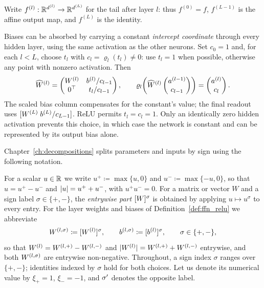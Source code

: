 Write $f^{(l)}:\mathbb{R}^{d^{(l)}}\to\mathbb{R}^{d^{(L)}}$ for the tail after layer $l$: thus $f^{(0)}=f$, $f^{(L-1)}$ is the affine output map, and $f^{(L)}$ is the identity.

\begin{remark}\label{rem:bias_augmentation}
Biases can be absorbed by carrying a constant \emph{intercept coordinate} through every hidden layer, using the same activation as the other neurons. Set $c_0=1$ and, for each $l<L$, choose $t_l$ with $c_l=\varrho_l(t_l)\neq0$: use $t_l=1$ when possible, otherwise any point with nonzero activation. Then
\[
\widehat W^{(l)}=
\begin{pmatrix}W^{(l)}&b^{(l)}/c_{l-1}\\0^\top&t_l/c_{l-1}\end{pmatrix},
\qquad
\varrho_l\!\left(\widehat W^{(l)}\begin{pmatrix}a^{(l-1)}\\c_{l-1}\end{pmatrix}\right)
=\begin{pmatrix}a^{(l)}\\c_l\end{pmatrix}.
\]
The scaled bias column compensates for the constant's value; the final readout uses $[W^{(L)}\;b^{(L)}/c_{L-1}]$. ReLU permits $t_l=c_l=1$. Only an identically zero hidden activation prevents this choice, in which case the network is constant and can be represented by its output bias alone.
\end{remark}

Chapter~\ref{ch:decompositions} splits parameters and inputs by sign using the following notation.

\begin{definition}\label{def:posneg_parts}
For a scalar $u \in \mathbb{R}$ we write $u^{+} \coloneqq \max\{u, 0\}$ and $u^{-} \coloneqq \max\{-u, 0\}$, so that $u = u^{+} - u^{-}$ and $\lvert u\rvert = u^{+} + u^{-}$, with $u^+ u^- = 0$. For a matrix or vector $W$ and a sign label $\sigma \in \{+,-\}$, the \emph{entrywise part} $[W]^{\sigma}$ is obtained by applying $u \mapsto u^{\sigma}$ to every entry. For the layer weights and biases of Definition~\ref{def:ffn_relu} we abbreviate
\begin{equation}
	W^{(l,\sigma)} \coloneqq [W^{(l)}]^{\sigma},
	\qquad
	b^{(l,\sigma)} \coloneqq [b^{(l)}]^{\sigma},
	\qquad \sigma \in \{+,-\},
	\label{eq:weight_split}
\end{equation}
so that $W^{(l)} = W^{(l,+)} - W^{(l,-)}$ and $\lvert W^{(l)}\rvert = W^{(l,+)} + W^{(l,-)}$ entrywise, and both $W^{(l,\sigma)}$ are entrywise non-negative. Throughout, a sign index $\sigma$ ranges over $\{+,-\}$; identities indexed by $\sigma$ hold for both choices. Let us denote its numerical value by $\xi_+=1$, $\xi_-=-1$, and $\sigma'$ denotes the opposite label.
\end{definition}

